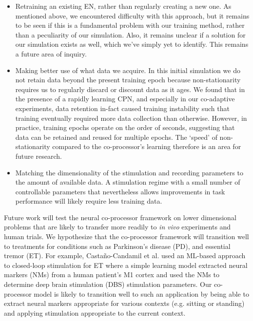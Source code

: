 \documentclass[12pt]{iopart}
\begin{document}
\begin{itemize}
	\item Retraining an existing EN, rather than regularly creating a new one. As
	      mentioned above, we encountered difficulty with this approach, but it remains
	      to be seen if this is a fundamental problem with our training method, rather
	      than a peculiarity of our simulation. Also, it remains unclear if a solution
	      for our simulation exists as well, which we've simply yet to identify. This
	      remains a future area of inquiry.
	\item Making better use of what data we acquire. In this initial simulation we do
	      not retain data beyond the present training epoch because non-stationarity requires us to
	      regularly discard or discount data as it ages. We found that in the presence
	      of a rapidly learning CPN, and especially in our co-adaptive experiments,
	      data retention in-fact caused training instability such that training
	      eventually required more data collection than otherwise. However, in
	      practice, training epochs operate on the order of seconds, suggesting
	      that data can be retained and reused for multiple epochs. The `speed' of 
	      non-stationarity compared to the co-processor's learning therefore is an
	      area for future research.
	\item Matching the dimensionality of the stimulation and recording parameters
	      to the amount of available data. A stimulation regime with
	      a small number of controllable parameters that nevertheless allows
	      improvements in task performance  will likely require less training data.
\end{itemize}

Future work will test the neural co-processor framework on  lower dimensional
problems that are likely to transfer more readily to \textit{in vivo} experiments
and human trials. We hypothesize that the co-processor framework will transition well
to treatments for conditions such as Parkinson's disease (PD), and essential tremor
(ET). For example, Castaño-Candamil et al. \cite{castano.pd} used an ML-based approach
to closed-loop stimulation for ET where a simple learning model extracted neural
markers (NMs) from a human patient's M1 cortex and used the NMs to determine deep
brain stimulation (DBS) stimulation parameters. Our co-processor model is
likely to transition well to such an application by being able to extract neural
markers appropriate for various contexts (e.g. sitting or standing) and applying 
stimulation appropriate to the current context.
\end{document}
